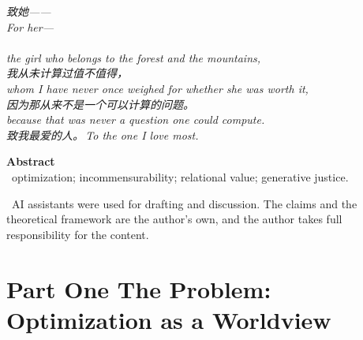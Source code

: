 \documentclass[11pt,a4paper]{article}
\begin{document}
\thispagestyle{empty}
\vspace*{4.5cm}
\begin{center}
\begin{minipage}{0.74\linewidth}
\centering\itshape\color{rose}
{\cjk 致她——}\\[0.3em]
For her---\\[0.7em]
\\[0.2em]
the girl who belongs to the forest and the mountains,\\[0.5em]
{\cjk 我从未计算过值不值得，}\\[0.2em]
whom I have never once weighed for whether she was worth it,\\[0.2em]
{\cjk 因为那从来不是一个可以计算的问题。}\\[0.2em]
because that was never a question one could compute.\\[1.0em]
{\upshape\footnotesize\color{gold} {\cjk 致我最爱的人。}\,\;To the one I love most.}
\end{minipage}
\end{center}
\newpage

\thispagestyle{empty}
\noindent\textbf{\large\color{rosedeep} Abstract}\\[0.6em]


\vspace{1.2em}
\, \textcolor{inksoft}{optimization; incommensurability; relational value; generative justice.}

\vspace{1.0em}
\, \textcolor{inksoft}{AI assistants were used for drafting and discussion. The claims and the theoretical framework are the author's own, and the author takes full responsibility for the content.}
\newpage

\tableofcontents
\newpage

\part*{\textcolor{rosedeep}{Part One \quad The Problem: Optimization as a Worldview}}
\end{document}
